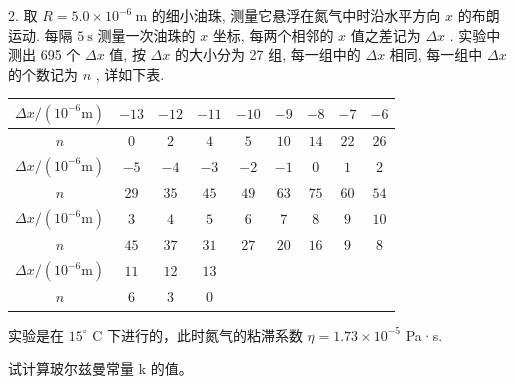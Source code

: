 2. 取 $R = 5.0 \times 10^{-6} \mathrm{~m}$ 的细小油珠, 测量它悬浮在氮气中时沿水平方向 $x$ 的布朗运动. 每隔 $5 \mathrm{~s}$ 测量一次油珠的 $x$ 坐标, 每两个相邻的 $x$ 值之差记为 $\Delta x$ . 实验中测出 695 个 $\Delta x$ 值, 按 $\Delta x$ 的大小分为 27 组, 每一组中的 $\Delta x$ 相同, 每一组中 $\Delta x$ 的个数记为 $n$ , 详如下表.
\begin{center}
    \begin{tabular}{|c|c|c|c|c|c|c|c|c|}
    \hline
    $\Delta x/(10^{-6} \mathrm{m})$ & $-13$ & $-12$ & $-11$ & $-10$ & $-9$ & $-8$ & $-7$ & $-6$ \\
    \hline
    $n$ & $0$ & $2$ & $4$ & $5$ & $10$ & $14$ & $22$ & $26$ \\
    \hline
    $\Delta x/(10^{-6} \mathrm{m})$ & $-5$ & $-4$ & $-3$ & $-2$ & $-1$ & $0$ & $1$ & $2$ \\
    \hline
    $n$ & $29$ & $35$ & $45$ & $49$ & $63$ & $75$ & $60$ & $54$ \\
    \hline
    $\Delta x/(10^{-6} \mathrm{m})$ & $3$ & $4$ & $5$ & $6$ & $7$ & $8$ & $9$ & $10$ \\
    \hline
    $n$ & $45$ & $37$ & $31$ & $27$ & $20$ & $16$ & $9$ & $8$ \\
    \hline
    $\Delta x/(10^{-6} \mathrm{m})$ & $11$ & $12$ & $13$ & & & & & \\
    \hline
    $n$ & $6$ & $3$ & $0$ & & & & & \\
    \hline
    \end{tabular}
\end{center}
实验是在 $15^{\circ}$ C 下进行的，此时氮气的粘滞系数 $\eta=1.73\times10^{-5}$ Pa·s.

试计算玻尔兹曼常量 k 的值。
\vfill
